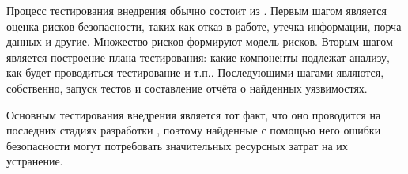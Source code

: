 %
Процесс тестирования внедрения обычно состоит из  . 
%
Первым шагом является оценка рисков безопасности, таких как отказ в работе, утечка информации, порча данных и другие. 
%
Множество рисков формируют модель рисков. 
%
Вторым шагом является построение плана тестирования: какие компоненты подлежат анализу, как будет проводиться тестирование и т.п.. 
%
Последующими шагами являются, собственно, запуск тестов и составление отчёта о найденных уязвимостях.

%
Основным  тестирования внедрения является тот факт, что оно проводится на последних стадиях разработки , поэтому найденные с помощью него ошибки безопасности могут потребовать значительных ресурсных затрат на их устранение.